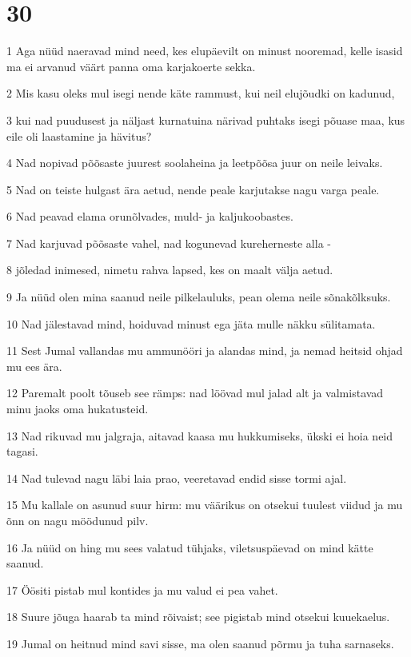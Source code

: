 \chapter{30}

\par 1 Aga nüüd naeravad mind need, kes elupäevilt on minust nooremad, kelle isasid ma ei arvanud väärt panna oma karjakoerte sekka.
\par 2 Mis kasu oleks mul isegi nende käte rammust, kui neil elujõudki on kadunud,
\par 3 kui nad puudusest ja näljast kurnatuina närivad puhtaks isegi põuase maa, kus eile oli laastamine ja hävitus?
\par 4 Nad nopivad põõsaste juurest soolaheina ja leetpõõsa juur on neile leivaks.
\par 5 Nad on teiste hulgast ära aetud, nende peale karjutakse nagu varga peale.
\par 6 Nad peavad elama orunõlvades, muld- ja kaljukoobastes.
\par 7 Nad karjuvad põõsaste vahel, nad kogunevad kureherneste alla -
\par 8 jõledad inimesed, nimetu rahva lapsed, kes on maalt välja aetud.
\par 9 Ja nüüd olen mina saanud neile pilkelauluks, pean olema neile sõnakõlksuks.
\par 10 Nad jälestavad mind, hoiduvad minust ega jäta mulle näkku sülitamata.
\par 11 Sest Jumal vallandas mu ammunööri ja alandas mind, ja nemad heitsid ohjad mu ees ära.
\par 12 Paremalt poolt tõuseb see rämps: nad löövad mul jalad alt ja valmistavad minu jaoks oma hukatusteid.
\par 13 Nad rikuvad mu jalgraja, aitavad kaasa mu hukkumiseks, ükski ei hoia neid tagasi.
\par 14 Nad tulevad nagu läbi laia prao, veeretavad endid sisse tormi ajal.
\par 15 Mu kallale on asunud suur hirm: mu väärikus on otsekui tuulest viidud ja mu õnn on nagu möödunud pilv.
\par 16 Ja nüüd on hing mu sees valatud tühjaks, viletsuspäevad on mind kätte saanud.
\par 17 Öösiti pistab mul kontides ja mu valud ei pea vahet.
\par 18 Suure jõuga haarab ta mind rõivaist; see pigistab mind otsekui kuuekaelus.
\par 19 Jumal on heitnud mind savi sisse, ma olen saanud põrmu ja tuha sarnaseks.
